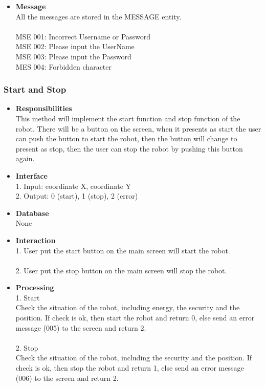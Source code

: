 \documentclass[11pt, a4paper]{article}
\begin{document}
\begin{itemize}
\item {\bfseries Message }\\
All the messages are stored in the MESSAGE entity.\\
\\
MSE 001: Incorrect Username or Password\\
MSE 002: Please input the UserName\\
MSE 003: Please input the Password\\
MES 004: Forbidden character\\
\end{itemize}

\subsubsection{Start and Stop}
\begin{itemize}
\item {\bfseries Responsibilities }\\
This method will implement the start function and stop function of the robot. There will be a button on the screen, when it presents as start the user can push the button to start the robot, then the button will change to present as stop, then the user can stop the robot by pushing this button again.

\item {\bfseries Interface }\\
1. Input: coordinate X, coordinate Y\\
2. Output: 0 (start), 1 (stop), 2 (error)\\

\item {\bfseries Database }\\
None

\item {\bfseries Interaction }\\
1. User put the start button on the main screen will start the robot.\\
\\
2. User put the stop button on the main screen will stop the robot.\\

\item {\bfseries Processing }\\
1. Start\\
Check the situation of the robot, including energy, the security and the position.
If check is ok, then start the robot and return 0, else send an error message (005) to the screen and return 2.\\
\\
2. Stop\\
Check the situation of the robot, including the security and the position.
If check is ok, then stop the robot and return 1, else send an error message (006) to the screen and return 2.\\


\end{itemize}
\end{document}

